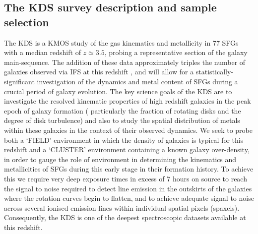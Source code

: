\documentclass[fleqn,usenatbib]{mnras}
\begin{document}
\subsection{The KDS survey description and sample selection}\label{subsec:survey_intro}
The KDS is a KMOS study of the gas kinematics and metallicity in 77 SFGs with a median redshift of $z\simeq3.5$, probing a representative section of the galaxy main-sequence.
The addition of these data approximately triples the number of galaxies observed via IFS at this redshift \citep{Cresci2010,Lemoine-Busserolle2010,Gnerucci2011}, and will allow for a statistically-significant investigation of the dynamics and metal content of SFGs during a crucial period of galaxy evolution. 
The key science goals of the KDS are to investigate the resolved kinematic properties of high redshift galaxies in the peak epoch of galaxy formation ( particularly the fraction of rotating disks and the degree of disk turbulence) and also to study the spatial distribution of metals within these galaxies in the context of their observed dynamics.
We seek to probe both a `FIELD' environment in which the density of galaxies is typical for this redshift and a `CLUSTER' environment containing a known galaxy over-density, in order to gauge the role of environment in determining the kinematics and metallicities of SFGs during this early stage in their formation history.
To achieve this we require very deep exposure times in excess of 7 hours on source to reach the signal to noise required to detect line emission in the outskirts of the galaxies where the rotation curves begin to flatten, and to achieve adequate signal to noise across several ionised emission lines within individual spatial pixels (spaxels).
Consequently, the KDS is one of the deepest spectroscopic datasets available at this redshift. 
\end{document}
